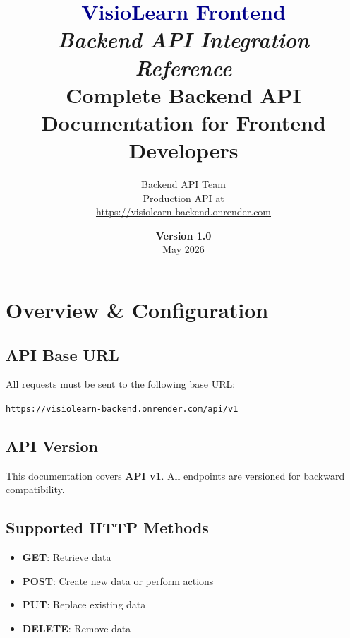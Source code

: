 \documentclass[12pt,a4paper,oneside]{article}
\title{%
    \vspace{2cm}
    \Huge\textbf{\textcolor{darkblue}{VisioLearn Frontend}} \\
    \vspace{0.5cm}
    \Large\textit{Backend API Integration Reference} \\
    \vspace{2cm}
    \large\textbf{Complete Backend API Documentation for Frontend Developers}
}
\author{%
    Backend API Team \\
    \vspace{0.5cm}
    Production API at \\
    \href{https://visiolearn-backend.onrender.com}{https://visiolearn-backend.onrender.com}
}
\date{\vspace{1cm}\large \textbf{Version 1.0} \\ May 2026}
\begin{document}
\maketitle
\thispagestyle{empty}
\newpage

\tableofcontents
\newpage

\section{Overview \& Configuration}

\subsection{API Base URL}

All requests must be sent to the following base URL:

\begin{tcolorbox}[colback=lightblue, colframe=darkblue, arc=0mm]
\texttt{https://visiolearn-backend.onrender.com/api/v1}
\end{tcolorbox}

\subsection{API Version}

This documentation covers \textbf{API v1}. All endpoints are versioned for backward compatibility.

\subsection{Supported HTTP Methods}

\begin{itemize}
    \item \textbf{GET}: Retrieve data
    \item \textbf{POST}: Create new data or perform actions
    \item \textbf{PUT}: Replace existing data
    \item \textbf{DELETE}: Remove data
\end{itemize}
\end{document}
